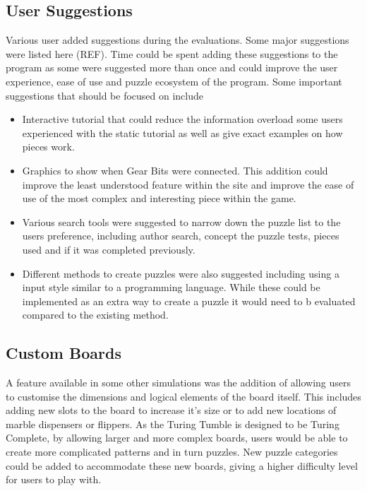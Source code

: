 \documentclass{l4proj}
\begin{document}
\subsection{User Suggestions}
Various user added suggestions during the evaluations. Some major suggestions were listed here (REF). Time could be spent adding these suggestions to the program as some were suggested more than once and could improve the user experience, ease of use and puzzle ecosystem of the program. Some important suggestions that should be focused on include 
\begin{itemize}
    \item Interactive tutorial that could reduce the information overload some users experienced with the static tutorial as well as give exact examples on how pieces work.
    \item Graphics to show when Gear Bits were connected. This addition could improve the least understood feature within the site and improve the ease of use of the most complex and interesting piece within the game.
    \item Various search tools were suggested to narrow down the puzzle list to the users preference, including author search, concept the puzzle tests, pieces used and if it was completed previously.
    \item Different methods to create puzzles were also suggested including using a input style similar to a programming language. While these could be implemented as an extra way to create a puzzle it would need to b evaluated compared to the existing method.
\end{itemize}

\subsection{Custom Boards}
A feature available in some other simulations was the addition of allowing users to customise the dimensions and logical elements of the board itself. This includes adding new slots to the board to increase it's size or to add new locations of marble dispensers or flippers. As the Turing Tumble is designed to be Turing Complete, by allowing larger and more complex boards, users would be able to create more complicated patterns and in turn puzzles. New puzzle categories could be added to accommodate these new boards, giving a higher difficulty level for users to play with.  
\end{document}
